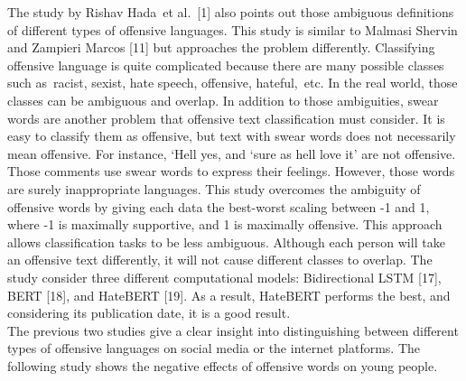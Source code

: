 \documentclass[12pt, natbib=false]{article}
\begin{document}
The study by Rishav Hada et al. [1] also points out those ambiguous definitions of different types of offensive languages. This study is similar to Malmasi Shervin and Zampieri Marcos [11] but approaches the problem differently. Classifying offensive language is quite complicated because there are many possible classes such as racist, sexist, hate speech, offensive, hateful, etc. In the real world, those classes can be ambiguous and overlap. In addition to those ambiguities, swear words are another problem that offensive text classification must consider. It is easy to classify them as offensive, but text with swear words does not necessarily mean offensive. For instance, ‘Hell yes, and ‘sure as hell love it’ are not offensive. Those comments use swear words to express their feelings. However, those words are surely inappropriate languages. This study overcomes the ambiguity of offensive words by giving each data the best-worst scaling between -1 and 1, where -1 is maximally supportive, and 1 is maximally offensive. This approach allows classification tasks to be less ambiguous. Although each person will take an offensive text differently, it will not cause different classes to overlap. The study consider three different computational models: Bidirectional LSTM [17], BERT [18], and HateBERT [19]. As a result, HateBERT performs the best, and considering its publication date, it is a good result. \\
The previous two studies give a clear insight into distinguishing between different types of offensive languages on social media or the internet platforms. The following study shows the negative effects of offensive words on young people. 
\end{document}
